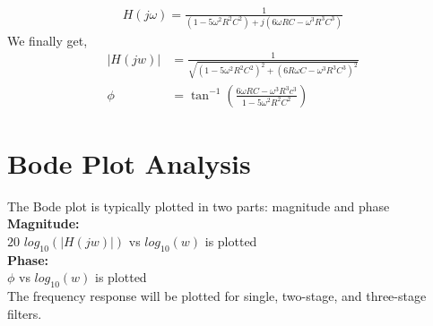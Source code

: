 \documentclass[a4paper,12pt]{article}
\begin{document}
\begin{align*}
H(j\omega) = \frac{1}{(1-5\omega^2R^2C^2) + j(6\omega RC - \omega^3R^3C^3)}
\end{align*}
We finally get,
\begin{align*}
    |H(jw)| &= \frac{1}{\sqrt{(1 - 5\omega^2 R^2 C^2)^2 +(6R\omega C - \omega^3R^3C^3)^2}} \\
    \phi &= \tan^{-1}\left( \frac{6\omega RC- \omega^3R^3c^3}{1-5\omega^2R^2C^2}\right)
\end{align*}
\section{Bode Plot Analysis}
The Bode plot is typically plotted in two parts: magnitude and phase\\

\textbf{Magnitude:}\\
$20$ $log_{10}(|H(jw)|)$ vs $log_{10}(w)$ is plotted\\

\textbf{Phase:}\\
$\phi$ vs $log_{10}(w)$ is plotted\\

The frequency response will be plotted for single, two-stage, and three-stage filters.
\end{document}
